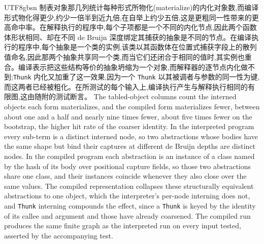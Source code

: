\begin{CJK*}{UTF8}{gbsn}
  \ifTablambdaChinese
  制表对象那几列统计每种形式所物化(materialize)的内化对象数,而编译形式物化得更少,约少一倍半到近九倍,在自举上约少五倍,这是更粗同一性带来的更高命中率。在解释执行的程序中,每个子项都是一个不同的内化节点,因此两个函数体形状相同、却在不同 de Bruijn 深度绑定其捕获的抽象是不同的节点。在编译执行的程序中,每个抽象是一个类的实例,该类以其函数体在位置式捕获字段上的散列值命名,因此那两个抽象共享同一个类,而当它们还闭合于相同的值时,其实例也重合。编译表示把这些结构等价的抽象坍缩为一个对象,而解释器的逐节点内化做不到;\texttt{Thunk} 内化又加重了这一效果,因为一个 \texttt{Thunk} 以其被调者与参数的同一性为键,而这两者已经被粗化。在所测试的每个输入上,编译执行产生与解释执行相同的有限图,这由随附的测试断言。
  \else
  The tabled-object columns count the interned objects each form materializes, and the compiled form materializes fewer, between about one and a half and nearly nine times fewer, about five times fewer on the bootstrap, the higher hit rate of the coarser identity. In the interpreted program every sub-term is a distinct interned node, so two abstractions whose bodies have the same shape but bind their captures at different de Bruijn depths are distinct nodes. In the compiled program each abstraction is an instance of a class named by the hash of its body over positional capture fields, so those two abstractions share one class, and their instances coincide whenever they also close over the same values. The compiled representation collapses these structurally equivalent abstractions to one object, which the interpreter's per-node interning does not, and \texttt{Thunk} interning compounds the effect, since a \texttt{Thunk} is keyed by the identity of its callee and argument and those have already coarsened. The compiled run produces the same finite graph as the interpreted run on every input tested, asserted by the accompanying test.
  \fi


\end{CJK*}
